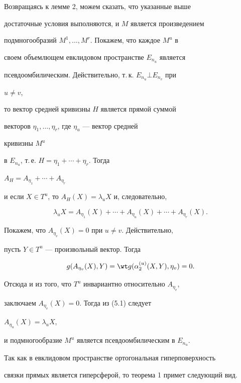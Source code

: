Возвращаясь к лемме 2, можем сказать, что указанные выше


достаточные условия выполняются, и $M$ является произведением


подмногообразий $M^1,\dotsc,M^r$. Покажем, что каждое $M^u$ в


своем объемлющем евклидовом пространстве $E_{n_u}$ является


псевдоомбилическим. Действительно, т.\,к. $E_{n_u}\bot E_{n_v}$ при


$u\ne v$,


то вектор средней кривизны $H$ является прямой суммой


векторов $\eta_1,\dotsc,\eta_r$, где $\eta_u$ --- вектор средней


кривизны $M^u$


в $E_{n_u}$, т.\,е. $H=\eta_1+\dotsb+\eta_r$. Тогда


$A_H=A_{\eta_1}+\dotsb+A_{\eta_r}$


и если $X\in T^u$, то $A_H(X)=\lambda_u X$ и, следовательно,


\begin{equation}


\lambda_u X=A_{\eta_1}(X)+\dotsb+A_{\eta_u}(X)+\dotsb+


A_{\eta_r}(X).


\end{equation}


Покажем, что $A_{\eta_v}(X)=0$ при $u\ne v$. Действительно,


пусть $Y\in T^u$ --- произвольный вектор. Тогда


$$


g(A_{\eta_v}(X),Y)=\wt g(\alpha^{(u)}_2(X,Y),\eta_v)=0.


$$


Отсюда и из того, что $T^u$ инвариантно относительно $A_{\eta_v}$,


заключаем $A_{\eta_v}(X)=0$. Тогда из (5.1) следует


$A_{\eta_u}(X)=\lambda_u X$,


и подмногообразие $M^u$ является псевдоомбилическим в $E_{n_u}$.


Так как в евклидовом пространстве ортогональная гиперповерхность


связки прямых является гиперсферой, то теорема 1 примет следующий вид.





